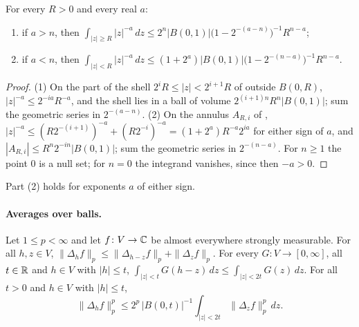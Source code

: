 \begin{lemma}
\label{lem:radial-power-integrals}
\leanok
{}
For every $R > 0$ and every real $a$:
\begin{enumerate}
  \item if $a > n$, then
    $\int_{|z| \geq R} |z|^{-a} \, dz \leq 2^n |B(0, 1)| \bigl(1 - 2^{-(a - n)}\bigr)^{-1}
    R^{n - a}$;
  \item if $a < n$, then
    $\int_{|z| < R} |z|^{-a} \, dz \leq (1 + 2^a) |B(0, 1)| \bigl(1 - 2^{-(n - a)}\bigr)^{-1}
    R^{n - a}$.
\end{enumerate}
\end{lemma}

\begin{proof}
\leanok
(1) On the part of the shell $2^i R \leq |z| < 2^{i+1} R$ of 
outside $B(0, R)$, $|z|^{-a} \leq 2^{-ia} R^{-a}$, and the shell lies in a ball of volume
$2^{(i+1)n} R^n |B(0, 1)|$; sum the geometric series in $2^{-(a-n)}$. (2) On the annulus
$A_{R, i}$ of ,
$|z|^{-a} \leq (R 2^{-(i+1)})^{-a} + (R 2^{-i})^{-a} = (1 + 2^a) R^{-a} 2^{ia}$ for either sign
of $a$, and $|A_{R, i}| \leq R^n 2^{-in} |B(0, 1)|$; sum the geometric series in
$2^{-(n-a)}$. For $n \geq 1$ the point $0$ is a null set; for $n = 0$ the integrand vanishes,
since then $-a > 0$.
\end{proof}

Part (2) holds for exponents $a$ of either sign.

\paragraph{Averages over balls.}

\begin{lemma}
\label{lem:difference-average}
\leanok
{}
Let $1 \leq p < \infty$ and let $f \colon V \to \mathbb{C}$ be almost everywhere strongly measurable.
For all $h, z \in V$,
$\|\Delta_h f\|_p \leq \|\Delta_{h - z} f\|_p + \|\Delta_z f\|_p$. For every
$G \colon V \to [0, \infty]$, all $t \in \mathbb{R}$ and $h \in V$ with $|h| \leq t$,
$\int_{|z| < t} G(h - z) \, dz \leq \int_{|z| < 2t} G(z) \, dz$. For all $t > 0$ and $h \in V$
with $|h| \leq t$,
\[
  \|\Delta_h f\|_p^p \leq 2^p \, |B(0, t)|^{-1} \int_{|z| < 2t} \|\Delta_z f\|_p^p \, dz .
\]
\end{lemma}

